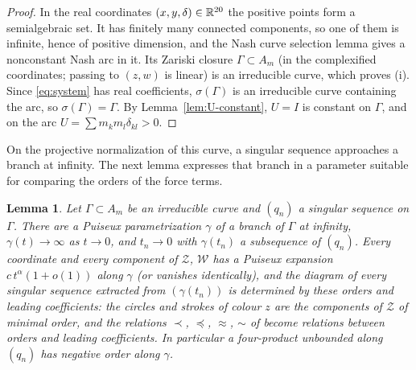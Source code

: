\documentclass[Threeside,11pt]{article}
\newtheorem{lemma}[theorem]{Lemma}
\theoremstyle{definition}
\theoremstyle{remark}
\numberwithin{equation}{section}
\theoremstyle{remark}
\begin{document}
\begin{proof}
In the real coordinates $(x,y,\delta)\in\mathbb R^{20}$ the positive points form a semialgebraic set.
It has finitely many connected components, so one of them is infinite, hence of positive
dimension, and the Nash curve selection lemma \cite[Prop.~8.1.13]{BCR} gives a nonconstant Nash arc in
it.  Its Zariski closure $\Gamma\subset A_m$ (in the complexified coordinates; passing to $(z,w)$ is linear) is an
irreducible curve, which proves (i).  Since \eqref{eq:system} has real coefficients, $\sigma(
\Gamma)$ is an irreducible curve containing the arc, so $\sigma(\Gamma)=\Gamma$.  By
Lemma~\ref{lem:U-constant}, $U=I$ is constant on $\Gamma$, and on the arc
$U=\sum m_km_l\delta_{kl}>0$.
\end{proof}

On the projective normalization of this curve, a singular sequence approaches a branch
at infinity.  The next lemma expresses that branch in a parameter suitable for comparing
the orders of the force terms.

\begin{lemma}\label{lem:germ}
Let $\Gamma\subset A_m$ be an irreducible curve and $(q_n)$ a singular sequence on $\Gamma$.  There
are a Puiseux parametrization $\gamma$ of a branch of $\Gamma$ at infinity, $\gamma(t)\to\infty$ as
$t\to 0$, and $t_n\to0$ with $\gamma(t_n)$ a subsequence of $(q_n)$.  Every coordinate and every
component of $\mathcal Z$, $\mathcal W$ has a Puiseux expansion $c\,t^{\alpha}(1+o(1))$ along
$\gamma$ (or vanishes identically), and the diagram of every singular sequence extracted from
$(\gamma(t_n))$ is determined by these orders and leading coefficients: the circles and strokes
of colour $z$ are the components of $\mathcal Z$ of minimal order, and the relations $\prec$,
$\preccurlyeq$, $\approx$, $\sim$ of \cite[\S3]{AK} become relations between orders and leading
coefficients.  In particular a four-product unbounded along $(q_n)$ has negative order along
$\gamma$.
\end{lemma}
\end{document}
